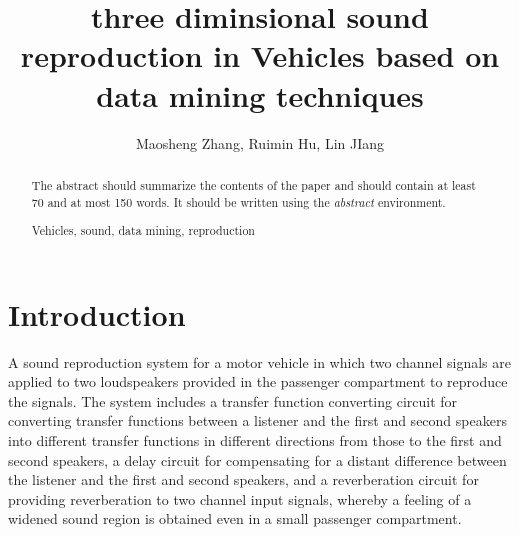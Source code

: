 \documentclass[runningheads,a4paper]{llncs}
\newcommand{\keywords}[1]{\par\addvspace\baselineskip
\noindent\keywordname\enspace\ignorespaces#1}
\begin{document}
\mainmatter  %

\title{ three diminsional sound reproduction in Vehicles based on data mining techniques }

%
%
\author{Maosheng Zhang, Ruimin Hu, Lin JIang}
%
%

\maketitle

\begin{abstract}
The abstract should summarize the contents of the paper and should
contain at least 70 and at most 150 words. It should be written using the
\emph{abstract} environment.
\keywords{Vehicles, sound, data mining, reproduction}
\end{abstract}


\section{Introduction}\label{sec:Intro}

A sound reproduction system for a motor vehicle in which two channel signals are applied to two loudspeakers provided in the passenger compartment to reproduce the signals. The system includes a transfer function converting circuit for converting transfer functions between a listener and the first and second speakers into different transfer functions in different directions from those to the first and second speakers, a delay circuit for compensating for a distant difference between the listener and the first and second speakers, and a reverberation circuit for providing reverberation to two channel input signals, whereby a feeling of a widened sound region is obtained even in a small passenger compartment.\cite{Akito82}
\end{document}
